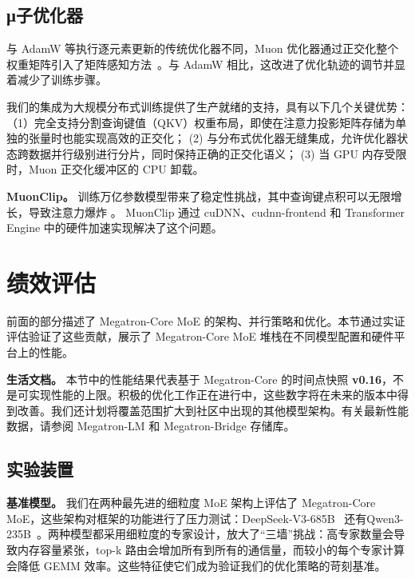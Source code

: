 \subsection{μ子优化器}
与 AdamW 等执行逐元素更新的传统优化器不同，Muon 优化器通过正交化整个权重矩阵引入了矩阵感知方法~\cite{liu2025muonscalablellmtraining}。与 AdamW 相比，这改进了优化轨迹的调节并显着减少了训练步骤。

我们的集成为大规模分布式训练提供了生产就绪的支持，具有以下几个关键优势：（1）完全支持分割查询键值（QKV）权重布局，即使在注意力投影矩阵存储为单独的张量时也能实现高效的正交化； (2) 与分布式优化器无缝集成，允许优化器状态跨数据并行级别进行分片，同时保持正确的正交化语义； (3) 当 GPU 内存受限时，Muon 正交化缓冲区的 CPU 卸载。

\textbf{MuonClip。}
训练万亿参数模型带来了稳定性挑战，其中查询键点积可以无限增长，导致注意力爆炸 \cite{kimik2}。 MuonClip 通过 cuDNN、cudnn-frontend 和 Transformer Engine 中的硬件加速实现解决了这个问题。

\section{绩效评估}\label{performance-evaluations}
前面的部分描述了 Megatron-Core MoE 的架构、并行策略和优化。本节通过实证评估验证了这些贡献，展示了 Megatron-Core MoE 堆栈在不同模型配置和硬件平台上的性能。

\begin{notebox}
\textbf{生活文档。} 本节中的性能结果代表基于 Megatron-Core 的时间点快照 \textbf{v0.16}，不是可实现性能的上限。积极的优化工作正在进行中，这些数字将在未来的版本中得到改善。我们还计划将覆盖范围扩大到社区中出现的其他模型架构。有关最新性能数据，请参阅 Megatron-LM 和 Megatron-Bridge 存储库。
\end{notebox}

\subsection{实验装置}

\textbf{基准模型。}
我们在两种最先进的细粒度 MoE 架构上评估了 Megatron-Core MoE，这些架构对框架的功能进行了压力测试：DeepSeek-V3-685B~\cite{deepseekai2025deepseekv3technicalreport} 还有Qwen3-235B~\cite{qwen2025qwen25technicalreport,yang2025qwen3technicalreport}。两种模型都采用细粒度的专家设计，放大了“三墙”挑战：高专家数量会导致内存容量紧张，top-k 路由会增加所有到所有的通信量，而较小的每个专家计算会降低 GEMM 效率。这些特征使它们成为验证我们的优化策略的苛刻基准。

